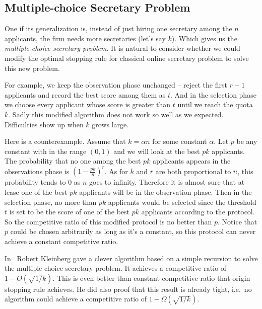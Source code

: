 \subsection{Multiple-choice Secretary Problem}

One if its generalization is, instead of just hiring one secretary among
the $n$ applicants, the firm needs more secretaries (let's say $k$).
Which gives us the \emph{multiple-choice secretary problem}.
It is natural to consider whether we could modify the optimal stopping rule
for classical online secretary problem to solve this new problem.

For example, we keep the observation phase unchanged -- reject the first
$r - 1$ applicants and record the best score among them as $t$. And in
the selection phase we choose every applicant whose score is greater than 
$t$ until we reach the quota $k$. Sadly this modified algorithm does not
work so well as we expected. Difficulties show up when $k$ grows large.

Here is a counterexample. Assume that $k = \alpha n$ for some constant 
$\alpha$. Let $p$ be any constant with in the range $(0, 1)$ and 
we will look at the best $p k$ applicants. The probability that no one
among the best $p k$ applicants appears in the observations phase is
$(1 - \frac{p k}{n})^r$. As for $k$ and $r$ are both proportional to $n$,
this probability tends to 0 as $n$ goes to infinity. Therefore it is almost
sure that at lease one of the best $p k$ applicants will be in the
observation phase. Then in the selection phase, no more than $p k$
applicants would be selected since the threshold $t$ is set to be the score
of one of the best $p k$ applicants according to the protocol.
So the competitive ratio of this modified protocol is no better than $p$.
Notice that $p$ could be chosen arbitrarily as long as it's a constant, 
so this protocol can never achieve a constant competitive ratio.

In~\cite{kleinberg2005multiple} Robert Kleinberg gave a clever algorithm
based on a simple recursion to solve the multiple-choice secretary problem.
It achieves a competitive ratio of $1 - O(\sqrt{1 / k})$. 
This is even better than constant competitive ratio that origin stopping 
rule achieves. He did also proof that this result is already tight,
i.e.\ no algorithm could achieve a competitive ratio of 
$1 - \Omega(\sqrt{1 / k})$.

